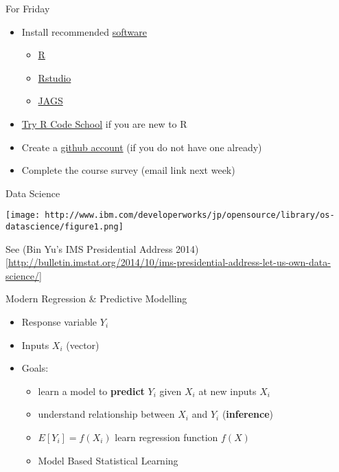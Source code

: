 \documentclass[ignorenonframetext,]{beamer}
\providecommand{\tightlist}{%
  \setlength{\itemsep}{0pt}\setlength{\parskip}{0pt}}
\begin{document}
\begin{frame}{For Friday}
\protect\hypertarget{for-friday}{}

\begin{itemize}[<+->]
\tightlist
\item
  Install recommended
  \href{http://www2.stat.duke.edu/courses/Spring17/sta521/resources/}{software}

  \begin{itemize}[<+->]
  \tightlist
  \item
    \href{http://cran.r-project.org}{R}
  \item
    \href{https://www.rstudio.com/products/rstudio/download/}{Rstudio}
  \item
    \href{http://mcmc-jags.sourceforge.net}{JAGS}
  \end{itemize}
\item
  \href{https://www.codeschool.com/courses/try-r}{Try R Code School} if
  you are new to R
\item
  Create a \href{http://github.com}{github account} (if you do not have
  one already)
\item
  Complete the course survey (email link next week)
\end{itemize}

\end{frame}

\begin{frame}{Data Science}
\protect\hypertarget{data-science}{}

\texttt{[image: http://www.ibm.com/developerworks/jp/opensource/library/os-datascience/figure1.png]}

See (Bin Yu's IMS Presidential Address
2014){[}\url{http://bulletin.imstat.org/2014/10/ims-presidential-address-let-us-own-data-science/}{]}

\end{frame}

\begin{frame}{Modern Regression \& Predictive Modelling}
\protect\hypertarget{modern-regression-predictive-modelling}{}

\begin{itemize}[<+->]
\tightlist
\item
  Response variable \(Y_i\)
\item
  Inputs \(X_i\) (vector)
\item
  Goals:

  \begin{itemize}[<+->]
  \tightlist
  \item
    learn a model to \textbf{predict} \(Y_i\) given \(X_i\) at new
    inputs \(X_i\)\\
  \item
    understand relationship between \(X_i\) and \(Y_i\)
    (\textbf{inference})
  \item
    \(E[Y_i] = f(X_i)\) learn regression function \(f(X)\)
  \item
    Model Based Statistical Learning
  \end{itemize}
\end{itemize}

\end{frame}
\end{document}
